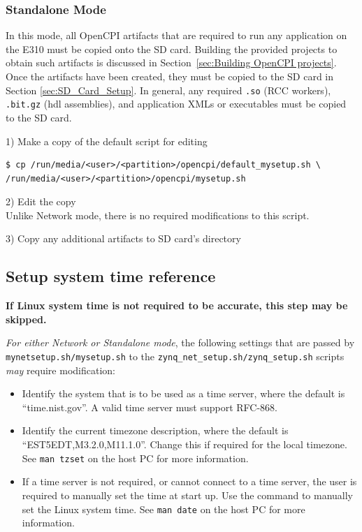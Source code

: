 \begin{flushleft}
\subsubsection{Standalone Mode}
In this mode, all OpenCPI artifacts that are required to run any application on the E310 must be copied onto the SD card.  Building the provided projects to obtain such artifacts is discussed in Section~\ref{sec:Building OpenCPI projects}. Once the artifacts have been created, they must be copied to the SD card in Section \ref{sec:SD_Card_Setup}. In general, any required \texttt{.so} (RCC workers), \texttt{.bit.gz} (hdl assemblies), and application XMLs or executables must be copied to the SD card.\medskip

1) Make a copy of the default script for editing
\begin{verbatim}
$ cp /run/media/<user>/<partition>/opencpi/default_mysetup.sh \
/run/media/<user>/<partition>/opencpi/mysetup.sh
\end{verbatim}\medskip

2) Edit the copy\\ \medskip
Unlike Network mode, there is no required modifications to this script. \medskip

3) Copy any additional artifacts to SD card's  directory \medskip

\subsection{Setup system time reference}
\textbf{If Linux system time is not required to be accurate, this step may be skipped.} \\ \medskip

\textit{For either Network or Standalone mode}, the following settings that are passed by \texttt{mynetsetup.sh/mysetup.sh} to the \texttt{zynq\_net\_setup.sh/zynq\_setup.sh} scripts \textit{may} require modification:

\begin{itemize}
 \item Identify the system that is to be used as a time server, where the default is ``time.nist.gov''. A valid time server must support RFC-868.
 \item Identify the current timezone description, where the default is ``EST5EDT,M3.2.0,M11.1.0''. Change this if required for the local timezone. See \texttt{man tzset} on the host PC for more information.
 \item If a time server is not required, or cannot connect to a time server, the user is required to manually set the time at start up.  Use the \code{date} command to manually set the Linux system time. See \texttt{man date} on the host PC for more information.
\end{itemize}
\end{flushleft}

